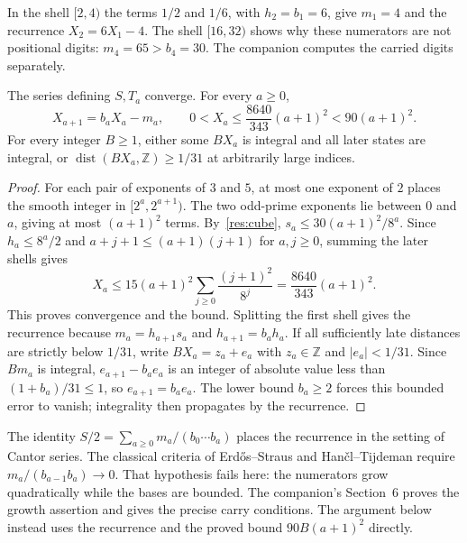 \documentclass[11pt]{article}
\begin{document}
In the shell $[2,4)$ the terms $1/2$ and $1/6$, with $h_2=b_1=6$,
give $m_1=4$ and the recurrence $X_2=6X_1-4$.
The shell $[16,32)$ shows why these numerators are not positional digits:
$m_4=65>b_4=30$.  The companion computes the carried digits separately.

\begin{proposition}
\label{res:actual-orbit}
The series defining $S,T_a$ converge.  For every $a\ge0$,
\[
 X_{a+1}=b_aX_a-m_a,\qquad
 0<X_a\le\frac{8640}{343}(a+1)^2<90(a+1)^2.
\]
For every integer $B\ge1$, either some $BX_a$ is integral and all later
states are integral, or $\operatorname{dist}(BX_a,\mathbb Z)\ge1/31$
at arbitrarily large indices.
\end{proposition}
\begin{proof}
For each pair of exponents of $3$ and $5$, at most one exponent of $2$
places the smooth integer in $[2^a,2^{a+1})$.  The two odd-prime exponents
lie between $0$ and $a$, giving at most $(a+1)^2$ terms.  By~\eqref{res:cube},
$s_a\le30(a+1)^2/8^a$.  Since $h_a\le8^a/2$ and
$a+j+1\le(a+1)(j+1)$ for $a,j\ge0$, summing the later shells gives
\[
 X_a\le15(a+1)^2\sum_{j\ge0}\frac{(j+1)^2}{8^j}
      =\frac{8640}{343}(a+1)^2.
\]
This proves convergence and the bound.  Splitting the first shell gives
the recurrence because $m_a=h_{a+1}s_a$ and $h_{a+1}=b_ah_a$.
If all sufficiently late distances are strictly below $1/31$, write
$BX_a=z_a+e_a$ with $z_a\in\mathbb Z$ and $|e_a|<1/31$.
Since $Bm_a$ is integral, $e_{a+1}-b_ae_a$ is an integer of absolute
value less than $(1+b_a)/31\le1$, so $e_{a+1}=b_ae_a$.
The lower bound $b_a\ge2$ forces this bounded error to vanish;
integrality then propagates by the recurrence.
\end{proof}

The identity
$S/2=\sum_{a\ge0}m_a/(b_0\cdots b_a)$ places the recurrence in the
setting of Cantor series.  The classical criteria of Erd\H{o}s--Straus
\cite[Theorem~2.1]{erdosstraus1974} and Han\v{c}l--Tijdeman
\cite[Theorem~3.1]{hancltijdeman2004} require
$m_a/(b_{a-1}b_a)\to0$.  That hypothesis fails here: the numerators grow
quadratically while the bases are bounded.  The companion's Section~6
proves the growth assertion and gives the precise carry conditions.
The argument below instead uses the recurrence and the proved bound
$90B(a+1)^2$ directly.
\end{document}

